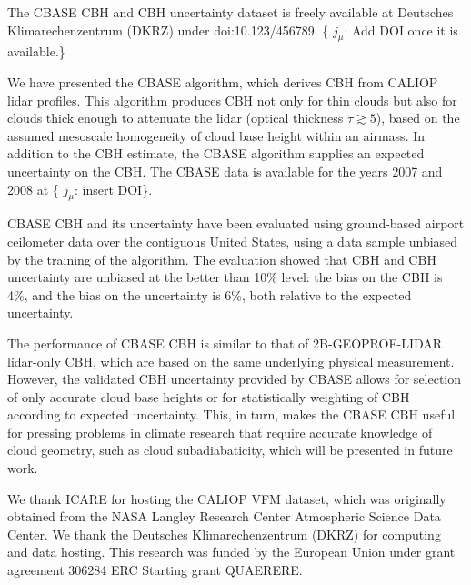 \documentclass[essd,manuscript]{copernicus}\usepackage[]{graphicx}\usepackage[]{color}
\newcommand{\hlnum}[1]{\textcolor[rgb]{0.686,0.059,0.569}{#1}}%
\newcommand\comment[2]{\{\hlnum{ \textit{#1}: #2}\}}
\newcommand\commentjm[1]{\comment{$j_\mu$}{#1}}
\begin{document}
The CBASE CBH and CBH uncertainty dataset \citep{cbase} is freely available at
Deutsches Klimarechenzentrum (DKRZ) under doi:10.123/456789.  \commentjm{Add DOI
once it is available.}

\conclusions
\label{sec:conclusions}

We have presented the CBASE algorithm, which derives CBH from CALIOP lidar
profiles.  This algorithm produces CBH not only for thin clouds but also for
clouds thick enough to attenuate the lidar (optical thickness $\tau \gtrsim 5$),
based on the assumed mesoscale homogeneity of cloud base height within an
airmass.  In addition to the CBH estimate, the CBASE algorithm supplies an
expected uncertainty on the CBH.  The CBASE data is available for the years 2007
and 2008 at \commentjm{insert DOI}.

CBASE CBH and its uncertainty have been evaluated using
ground-based airport ceilometer data over the contiguous United States, using a
data sample unbiased by the training of the algorithm.  The evaluation showed that
CBH and CBH uncertainty are unbiased at the better
than 10\% level: the bias on the CBH is %
4\%,
and the bias on the uncertainty is %
6\%, both relative to the expected uncertainty.

The performance of CBASE CBH is similar to that of
2B-GEOPROF-LIDAR lidar-only CBH, which are based on the same
underlying physical measurement.  However, the validated CBH
uncertainty provided by CBASE allows for selection of only accurate cloud base
heights or for statistically weighting of CBH according to 
expected uncertainty.  This, in turn, makes the CBASE CBH useful
for pressing problems in climate research that require accurate knowledge of
cloud geometry, such as cloud subadiabaticity, which will be presented in future
work. 

\begin{acknowledgements}
  We thank ICARE for hosting the CALIOP VFM dataset, which was originally
  obtained from the NASA Langley Research Center Atmospheric Science Data
  Center.  We thank the Deutsches Klimarechenzentrum (DKRZ) for computing and
  data hosting.  This research was funded by the European Union under grant
  agreement 306284 ERC Starting grant QUAERERE.
\end{acknowledgements}



\end{document}
